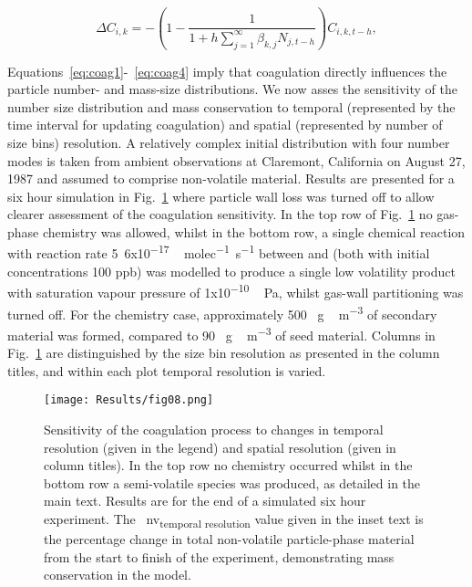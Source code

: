 \documentclass[gmd, manuscript]{copernicus}
\begin{document}
\begin{equation} \label{eq:coag4}
\Delta C_{i,k} = -\left(1-\frac{1}{1+h\sum_{j=1}^{\infty}\beta_{k,j}N_{j,t-h}}\right)C_{i,k,t-h},
\end{equation}

Equations~\ref{eq:coag1}-~\ref{eq:coag4} imply that coagulation directly influences the particle number- and mass-size distributions.  We now asses the sensitivity of the number size distribution and mass conservation to temporal (represented by the time interval for updating coagulation) and spatial (represented by number of size bins) resolution.  A relatively complex initial distribution with four number modes is taken from ambient observations at Claremont, California on August 27, 1987 \citep{Jacobson2005} and assumed to comprise non-volatile material.  Results are presented for a six hour simulation in Fig.~\ref{fig:coag_resol_test_plot} where particle wall loss was turned off to allow clearer assessment of the coagulation sensitivity.  In the top row of Fig.~\ref{fig:coag_resol_test_plot} no gas-phase chemistry was allowed, whilst in the bottom row, a single chemical reaction with reaction rate \unit{5.6x10^{-17}\, molec^{-1}s^{-1}}  between  and  (both with initial concentrations 100 \unit{ppb}) was modelled to produce a single low volatility product with saturation vapour pressure of \unit{1x10^{-10}\, Pa}, whilst gas-wall partitioning was turned off.  For the chemistry case, approximately 500 \unit{\mu g\, m^{-3}} of secondary material was formed, compared to  90 \unit{\mu g\,m^{-3}} of seed material.  Columns in Fig.~\ref{fig:coag_resol_test_plot} are distinguished by the size bin resolution as presented in the column titles, and within each plot temporal resolution is varied.

\begin{figure}[t]
\texttt{[image: Results/fig08.png]}
\caption{Sensitivity of the coagulation process to changes in temporal resolution (given in the legend) and spatial resolution (given in column titles).  In the top row no chemistry occurred whilst in the bottom row a semi-volatile species was produced, as detailed in the main text.  Results are for the end of a simulated six hour experiment.  The \unit{\Delta nv_{temporal\; resolution}} value given in the inset text is the percentage change in total non-volatile particle-phase material from the start to finish of the experiment, demonstrating mass conservation in the model.}
\label{fig:coag_resol_test_plot}
\end{figure}
\end{document}
